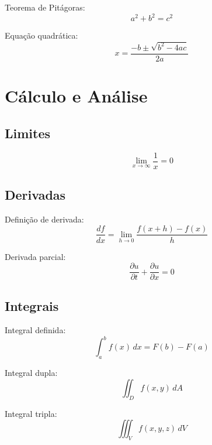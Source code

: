 Teorema de Pitágoras:
\begin{equation}
a^2 + b^2 = c^2
\end{equation}

Equação quadrática:
\begin{equation}
x = \frac{-b \pm \sqrt{b^2 - 4ac}}{2a}
\end{equation}


\section{Cálculo e Análise}

\subsection{Limites}

\begin{equation}
\lim_{x \to \infty} \frac{1}{x} = 0
\end{equation}

\subsection{Derivadas}

Definição de derivada:
\begin{equation}
\frac{df}{dx} = \lim_{h \to 0} \frac{f(x+h) - f(x)}{h}
\end{equation}

Derivada parcial:
\begin{equation}
\frac{\partial u}{\partial t} + \frac{\partial u}{\partial x} = 0
\end{equation}

\subsection{Integrais}

Integral definida:
\begin{equation}
\int_a^b f(x)\,dx = F(b) - F(a)
\end{equation}

Integral dupla:
\begin{equation}
\iint_D f(x,y)\,dA
\end{equation}

Integral tripla:
\begin{equation}
\iiint_V f(x,y,z)\,dV
\end{equation}

